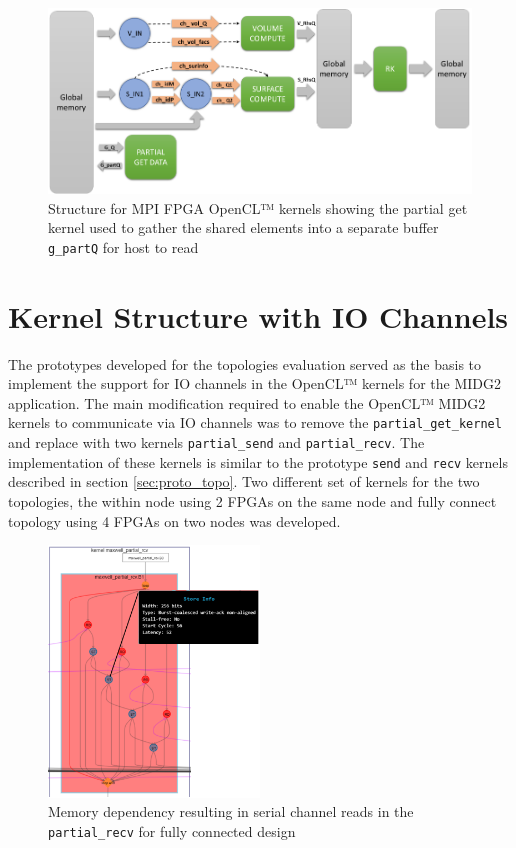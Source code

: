 \begin{figure}%
    \centering
    \includegraphics[width=1.0\textwidth]{images/base_kernstruc}
    \caption{Structure for MPI FPGA OpenCL™ kernels showing the partial get kernel used to gather
     the shared elements into a separate buffer \texttt{g\_partQ} for host to read}
    \label{fig:base_kernstruc}
\end{figure}

\section{Kernel Structure with IO Channels}
\label{sec:struc_iochan}

The prototypes developed for the topologies evaluation served as the basis to implement
the support for IO channels in the OpenCL™ kernels for the MIDG2 application. The main
modification required to enable the OpenCL™ MIDG2 kernels to communicate via IO channels
was to remove the \texttt{partial\_get\_kernel} and replace with two kernels
\texttt{partial\_send} and \texttt{partial\_recv}. The implementation of these kernels
is similar to the prototype \texttt{send} and \texttt{recv} kernels described in
section \ref{sec:proto_topo}. Two different set of kernels for the two topologies,
the within node using 2 FPGAs on the same node and fully connect topology using
4 FPGAs on two nodes was developed.


\begin{figure}%
    \centering
    \includegraphics[width=0.5\textwidth]{images/serial_reads}
    \caption{Memory dependency resulting in serial channel reads in the \texttt{partial\_recv}
    for fully connected design}
    \label{fig:serial_reads}
\end{figure}



